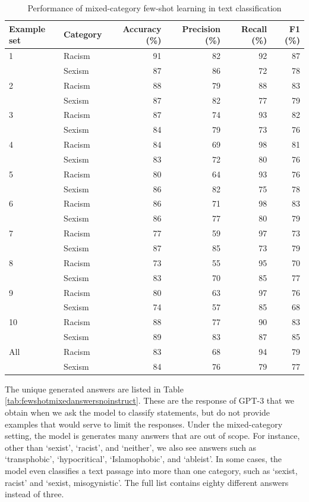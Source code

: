 \documentclass[12pt,]{article}
\begin{document}
\begin{table}

\caption{\label{tab:fewshotmixed-summary}Performance of mixed-category few-shot learning in text classification}
\centering
\begin{tabular}[t]{llrrrr}
\toprule
Example set & Category & Accuracy (\%) & Precision (\%) & Recall (\%) & F1 (\%)\\
\midrule
1 & Racism & 91 & 82 & 92 & 87\\
 & Sexism & 87 & 86 & 72 & 78\\
\midrule
2 & Racism & 88 & 79 & 88 & 83\\
 & Sexism & 87 & 82 & 77 & 79\\
\midrule
3 & Racism & 87 & 74 & 93 & 82\\
 & Sexism & 84 & 79 & 73 & 76\\
\midrule
4 & Racism & 84 & 69 & 98 & 81\\
 & Sexism & 83 & 72 & 80 & 76\\
\midrule
5 & Racism & 80 & 64 & 93 & 76\\
 & Sexism & 86 & 82 & 75 & 78\\
\midrule
6 & Racism & 86 & 71 & 98 & 83\\
 & Sexism & 86 & 77 & 80 & 79\\
\midrule
7 & Racism & 77 & 59 & 97 & 73\\
 & Sexism & 87 & 85 & 73 & 79\\
\midrule
8 & Racism & 73 & 55 & 95 & 70\\
 & Sexism & 83 & 70 & 85 & 77\\
\midrule
9 & Racism & 80 & 63 & 97 & 76\\
 & Sexism & 74 & 57 & 85 & 68\\
\midrule
10 & Racism & 88 & 77 & 90 & 83\\
 & Sexism & 89 & 83 & 87 & 85\\
\midrule
All & Racism & 83 & 68 & 94 & 79\\
 & Sexism & 84 & 76 & 79 & 77\\
\bottomrule
\end{tabular}
\end{table}

The unique generated answers are listed in Table \ref{tab:fewshotmixedanswersnoinstruct}. These are the response of GPT-3 that we obtain when we ask the model to classify statements, but do not provide examples that would serve to limit the responses. Under the mixed-category setting, the model is generates many answers that are out of scope. For instance, other than `sexist', `racist', and `neither', we also see answers such as `transphobic', `hypocritical', `Islamophobic', and `ableist'. In some cases, the model even classifies a text passage into more than one category, such as `sexist, racist' and `sexist, misogynistic'. The full list contains eighty different answers instead of three.
\end{document}
